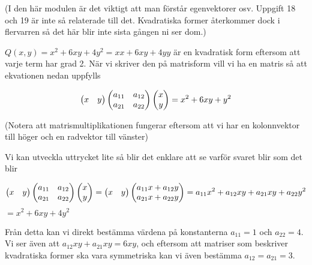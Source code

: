 \documentclass[../../main.tex]{subfiles}
\begin{document}
\begin{solution}{18}

(I den här modulen är det viktigt att man förstår egenvektorer osv. Uppgift 18 och 19 är inte så relaterade till det. Kvadratiska former återkommer dock i flervarren så det här blir inte sista gången ni ser dom.)


$Q(x, y) = x^2 + 6xy + 4y^2 = xx + 6xy + 4yy$ är en kvadratisk form eftersom att varje term har grad 2. När vi skriver den på matrisform vill vi ha en matris så att ekvationen nedan uppfylls

$$
\begin{pmatrix}
x & y
\end{pmatrix} \begin{pmatrix}
a_{11} & a_{12}\\
a_{21} & a_{22}
\end{pmatrix} \begin{pmatrix}x\\y\end{pmatrix}
= x^2 + 6xy + y^2
$$

(Notera att matrismultiplikationen fungerar eftersom att vi har en kolonnvektor till höger och en radvektor till vänster)

Vi kan utveckla uttrycket lite så blir det enklare att se varför svaret blir som det blir

$$
\begin{pmatrix}
x & y
\end{pmatrix} \begin{pmatrix}
a_{11} & a_{12}\\
a_{21} & a_{22}
\end{pmatrix} \begin{pmatrix}x\\y\end{pmatrix}=
\begin{pmatrix}
x & y
\end{pmatrix} \begin{pmatrix}a_{11}x + a_{12}y\\a_{21}x + a_{22}y\end{pmatrix} =
a_{11}x^2 + a_{12}xy + a_{21}xy + a_{22}y^2
$$
$
= x^2 + 6xy + 4y^2
$

Från detta kan vi direkt bestämma värdena på konstanterna $a_{11} = 1$ och $a_{22} = 4$. Vi ser även att $a_{12}xy + a_{21}xy = 6xy$, och eftersom att matriser som beskriver kvadratiska former ska vara symmetriska kan vi även bestämma  $a_{12} = a_{21} = 3$. 




\end{solution}
\end{document}
